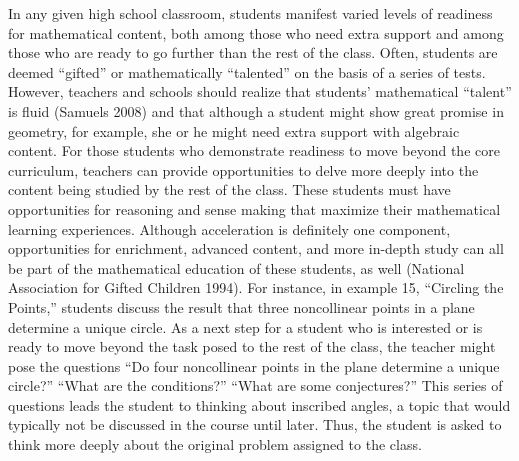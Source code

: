 \documentclass[
  10pt,
  a4paper,
  landscape,
  twoside,
  openany
]{scrbook}
\newcommand{\EN}[1]{#1}
\newcounter{example}
\begin{document}
\TriPara
{
\EN{In any given high school classroom, students manifest varied levels of readiness for mathematical content, both among those who need extra support and among those who are ready to go further than the rest of the class. Often, students are deemed ``gifted'' or mathematically ``talented'' on the basis of a series of tests. However, teachers and schools should realize that students' mathematical ``talent'' is fluid (Samuels 2008) and that although a student might show great promise in geometry, for example, she or he might need extra support with algebraic content. For those students who demonstrate readiness to move beyond the core curriculum, teachers can provide opportunities to delve more deeply into the content being studied by the rest of the class. These students must have opportunities for reasoning and sense making that maximize their mathematical learning experiences. Although acceleration is definitely one component, opportunities for enrichment, advanced content, and more in-depth study can all be part of the mathematical education of these students, as well (National Association for Gifted Children 1994). For instance, in example 15, ``Circling the Points,'' students discuss the result that three noncollinear points in a plane determine a unique circle. As a next step for a student who is interested or is ready to move beyond the task posed to the rest of the class, the teacher might pose the questions ``Do four noncollinear points in the plane determine a unique circle?'' ``What are the conditions?'' ``What are some conjectures?'' This series of questions leads the student to thinking about inscribed angles, a topic that would typically not be discussed in the course until later. Thus, the student is asked to think more deeply about the original problem assigned to the class.}
}
\end{document}
